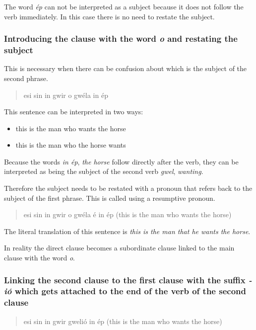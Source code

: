 The word \textit{\'{e}p} can not be interpreted as a subject because it does not follow the verb immediately. In this case there is no need to restate the subject.

\subsubsection{Introducing the clause with the word \textit{o} and restating the subject}

This is necessary when there can be confusion about which is the subject of the second phrase.

\begin{quote}
esi sin in gwir o gw\'{e}la in \'{e}p
\end{quote}

This sentence can be interpreted in two ways:
\begin{itemize}
    \item this is the man who wants the horse
    \item this is the man who the horse wants
\end{itemize}

Because the words \textit{in \'{e}p}, \textit{the horse} follow directly after the verb, they can be interpreted as being the subject of the second verb \textit{gwel}, \textit{wanting}.

Therefore the subject needs to be restated with a pronoun that refers back to the subject of the first phrase. This is called using a resumptive pronoun.

\begin{quote}
esi sin in gwir o gw\'{e}la \'{e} in \'{e}p (this is the man who wants the horse)
\end{quote}

The literal translation of this sentence is \textit{this is the man that he wants the horse}.

In reality the direct clause becomes a subordinate clause linked to the main clause with the word \textit{o}.

\subsubsection{Linking the second clause to the first clause with the suffix \textit{-i\'{o}} which gets attached to the end of the verb of the second clause}

\begin{quote}
esi sin in gwir gweli\'{o} in \'{e}p (this is the man who wants the horse)
\end{quote}

